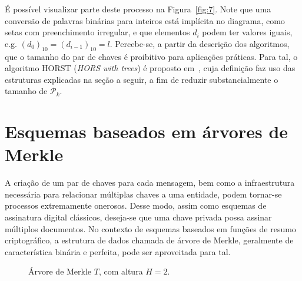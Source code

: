 \documentclass[12pt,notitlepage]{report}
\newcommand{\pk}{\mathcal{P}_k}
\newcommand{\hash}[2][]{\mathcal{H}^{#1}(#2)}
\newcommand{\concat}{\, \vert \vert \,}
\begin{document}
É possível visualizar parte deste processo na Figura~\ref{fig:7}. Note que uma conversão de palavras binárias para inteiros está implícita no diagrama, como setas com preenchimento irregular, e que elementos $d_i$ podem ter valores iguais, e.g. $(d_{0})_{10} = (d_{i-1})_{10} = l$. Percebe-se, a partir da descrição dos algoritmos, que o tamanho do par de chaves é proibitivo para aplicações práticas. Para tal, o algoritmo HORST (\emph{HORS with trees}) é proposto em~\cite{Bernstein2015}, cuja definição faz uso das estruturas explicadas na seção a seguir, a fim de reduzir substancialmente o tamanho de $\pk{}$.

\section{Esquemas baseados em árvores de Merkle}

A criação de um par de chaves para cada mensagem, bem como a infraestrutura
necessária para relacionar múltiplas chaves a uma entidade, podem tornar-se
processos extremamente onerosos. Desse modo, assim como esquemas de assinatura
digital clássicos, deseja-se que uma chave privada possa assinar múltiplos
documentos. No contexto de esquemas baseados em funções de resumo
criptográfico, a estrutura de dados chamada de árvore de Merkle, geralmente de
característica binária e perfeita, pode ser aproveitada para tal.

\begin{figure}[ht]
  \centering
  \caption{Árvore de Merkle $T$, com altura $H = 2$.}
  \label{fig:4}
\end{figure}
\end{document}
